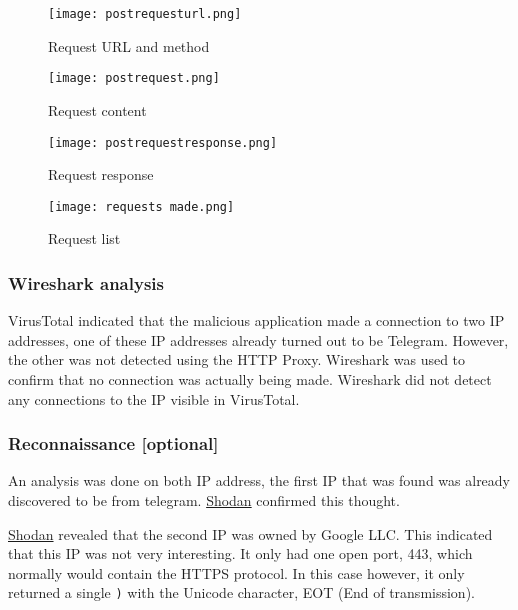 \begin{figure}[H]
    \texttt{[image: postrequesturl.png]}
    \caption{Request URL and method}
    \label{rafael-requesturl}
\end{figure}
\begin{figure}[H]
    \texttt{[image: postrequest.png]}
    \caption{Request content}
    \label{rafael-requestcontent}
\end{figure}
\begin{figure}[H]
    \texttt{[image: postrequestresponse.png]}
    \caption{Request response}
    \label{rafael-requestresponse}
\end{figure}
\begin{figure}[H]
    \texttt{[image: requests made.png]}
    \caption{Request list}
    \label{rafael-requestlist}
\end{figure}

\subsubsection{Wireshark analysis}

VirusTotal indicated that the malicious application made a connection to two IP addresses, one of these IP addresses already turned out to be Telegram.
However, the other was not detected using the HTTP Proxy.
Wireshark was used to confirm that no connection was actually being made. Wireshark did not detect any connections to the IP visible in VirusTotal.

\subsubsection{Reconnaissance [optional]}

An analysis was done on both IP address, the first IP that was found was already discovered to be from telegram.
\href{https://www.shodan.io/host/149.154.167.220}{Shodan} confirmed this thought.

\href{https://www.shodan.io/host/142.250.31.188}{Shodan} revealed that the second IP was owned by Google LLC. This indicated that this IP was not very interesting.
It only had one open port, 443, which normally would contain the HTTPS protocol.
In this case however, it only returned a single \texttt{)} with the Unicode character, EOT (End of transmission).